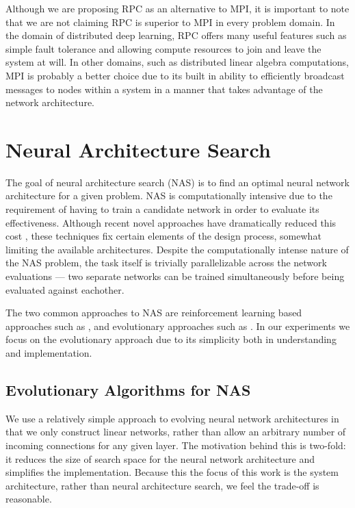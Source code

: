 \documentclass[conference]{IEEEtran}
\begin{document}
Although we are proposing RPC as an alternative to MPI, it is important to note
that we are not claiming RPC is superior to MPI in every problem domain. In the
domain of distributed deep learning, RPC offers many useful features such as
simple fault tolerance and allowing compute resources to join and leave the
system at will. In other domains, such as distributed linear algebra
computations, MPI is probably a better choice due to its built in ability to
efficiently broadcast messages to nodes within a system in a manner that takes
advantage of the network architecture.

\section{Neural Architecture Search}
The goal of neural architecture search (NAS) is to find an optimal neural
network architecture for a given problem. NAS is computationally intensive due
to the requirement of having to train a candidate network in order to evaluate
its effectiveness. Although recent novel approaches have dramatically reduced
this cost \cite{DBLP:journals/corr/abs-1708-05344, pmlr-v80-pham18a}, these
techniques fix certain elements of the design process, somewhat limiting the
available architectures. Despite the computationally intense nature of the NAS
problem, the task itself is trivially parallelizable across the network
evaluations --- two separate networks can be trained simultaneously before being
evaluated against eachother.

The two common approaches to NAS are reinforcement learning based approaches such
as \cite{45826, Kyriakides:2018:NAS:3200947.3208068, pmlr-v80-pham18a}, and
evolutionary approaches such as \cite{DBLP:journals/corr/abs-1711-00436,
  DBLP:journals/corr/MiikkulainenLMR17, DBLP:conf/icml/RealMSSSTLK17}. In our
experiments we focus on the evolutionary approach due to its simplicity both in
understanding and implementation.

\subsection{Evolutionary Algorithms for NAS}
We use a relatively simple approach to evolving neural network architectures
in that we only construct linear networks, rather than allow an arbitrary
number of incoming connections for any given layer. The motivation behind
this is two-fold: it reduces the size of search space for the neural network
architecture and simplifies the implementation. Because this the focus of
this work is the system architecture, rather than neural architecture search,
we feel the trade-off is reasonable.
\end{document}
